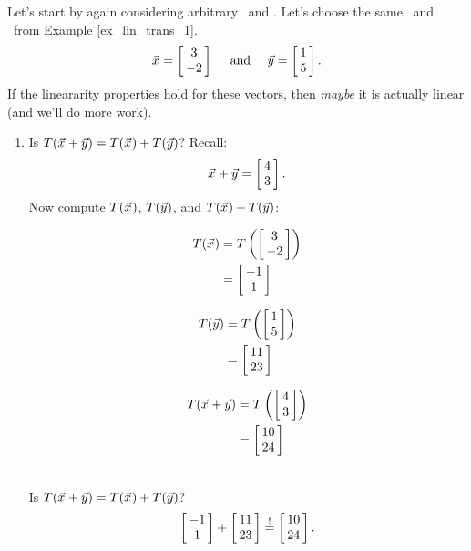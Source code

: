 {Let's start by again considering arbitrary \vx\ and \vy. Let's choose the same \vx\ and \vy\ from Example \ref{ex_lin_trans_1}. $$\vx = \bmx{c}3\\-2\emx \quad \text{ and } \quad \vy = \bmx{c} 1\\5\emx.$$ If the lineararity properties hold for these vectors, then \textit{maybe} it is actually linear (and we'll do more work). 
	\begin{enumerate}
	\item	Is $T(\vx+\vy) = T(\vx)+T(\vy)$? Recall:
	$$\vx+\vy = \bmx{c}4\\3\emx.$$ Now compute $T(\vx)$, $T(\vy)$, and $T(\vx)+T(\vy)$:

	\begin{adjustwidth}{-45pt}{-60pt}
	\begin{minipage}{.3\linewidth}
	\begin{align*} T(\vx) &= T\left(\bmx{c}3\\-2\emx\right) \\
											&= \bmx{c} -1\\1\emx \end{align*}
	\end{minipage}											
	\begin{minipage}{.3\linewidth}
	\begin{align*} T(\vy) &= T\left(\bmx{c}1\\5\emx\right) \\
											&= \bmx{c} 11\\23\emx \end{align*}
	\end{minipage}											
	\begin{minipage}{.3\linewidth}
	\begin{align*} T(\vx+\vy) &= T\left(\bmx{c}4\\3\emx\right) \\
											&= \bmx{c} 10\\24\emx \end{align*}
	\end{minipage}											
	\end{adjustwidth}
	
\ \\

Is $T(\vx+\vy) = T(\vx)+T(\vy)$? $$\bmx{c} -1\\1\emx+\bmx{c} 11\\23\emx \overset{!}{=} \bmx{c} 10\\24\emx.$$


\end{enumerate}}
